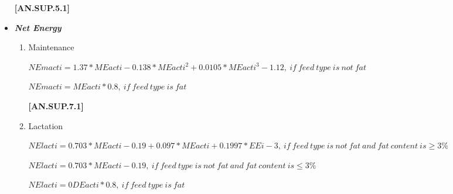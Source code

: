 \begin{refsection}
\begin{itemize}
            {\raggedleft \textbf{[AN.SUP.5.1]}\par}
            \vspace{0.5cm}

        \item \textbf{\textit{Net Energy}} 
    \vspace{0.25cm}

    \begin{enumerate}
        \item Maintenance
        \vspace{0.25cm}

        \begin{center}
        \(NEmacti = 1.37 * MEacti - 0.138 * MEacti^{2} + 0.0105 * MEacti^{3} - 1.12,\ if\ feed\ type\ is\ not\ fat\)
        \end{center}
        \vspace{0.5cm}

        \begin{center}
        \(NEmacti = MEacti * 0.8,\ if\ feed\ type\ is\ fat\)
        \end{center}
        \vspace{0.5cm}
    
            {\raggedleft \textbf{[AN.SUP.7.1]}\par}
            \vspace{0.5cm}

        \item Lactation
        \vspace{0.25cm}

        \begin{center}
        \(NElacti = 0.703 * MEacti - 0.19 + 0.097 * MEacti + 0.1997 * EEi - 3,\ if\ feed\ type\ is\ not\ fat\ and\ fat\ content\ is \geq 3\%\)
        \end{center}
        \vspace{0.5cm}

        \begin{center}
        \(NElacti = 0.703 * MEacti - 0.19,\ if\ feed\ type\ is\ not\ fat\ and\ fat\ content\ is \leq 3\%\)
        \end{center}
        \vspace{0.5cm}

        \begin{center}
        \(NElacti = 0DEacti * 0.8,\ if\ feed\ type\ is\ fat\)
        \end{center}
        \vspace{0.5cm}
    

\end{enumerate}
\end{itemize}
\end{refsection}
